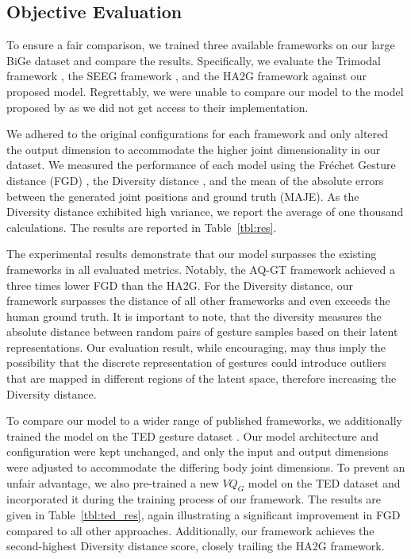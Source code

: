 \documentclass[sigconf]{acmart}
\begin{document}
\subsection{Objective Evaluation}
To ensure a fair comparison, we trained three available frameworks on our large BiGe dataset and compare the results. Specifically, we evaluate the Trimodal framework \cite{yoonSpeechGestureGeneration2020}, the SEEG framework \cite{liangSEEGSemanticEnergized2022}, and the HA2G framework \cite{liuLearningHierarchicalCrossModal2022a} against our proposed model. Regrettably, we were unable to compare our model to the model proposed by \citet{aoRhythmicGesticulatorRhythmAware2022a} as we did not get access to their implementation.

We adhered to the original configurations for each framework and only altered the output dimension to accommodate the higher joint dimensionality in our dataset. We measured the performance of each model using the Fréchet Gesture distance (FGD) \cite{yoonSpeechGestureGeneration2020}, the Diversity distance \cite{liuLearningHierarchicalCrossModal2022a}, and the mean of the absolute errors between the generated joint positions and ground truth (MAJE). As the Diversity distance exhibited high variance, we report the average of one thousand calculations. The results are reported in Table~\ref{tbl:res}.

The experimental results demonstrate that our model surpasses the existing frameworks in all evaluated metrics. Notably, the AQ-GT framework achieved a three times lower FGD than the HA2G. For the Diversity distance, our framework surpasses the distance of all other frameworks and even exceeds the human ground truth. It is important to note, that the diversity measures the absolute distance between random pairs of gesture samples based on their latent representations. Our evaluation result, while encouraging, may thus imply the possibility that the discrete representation of gestures could introduce outliers that are mapped in different regions of the latent space, therefore increasing the Diversity distance. 

To compare our model to a wider range of published frameworks, we additionally trained the model on the TED gesture dataset \cite{yoonRobotsLearnSocial2019a}. Our model architecture and configuration were kept unchanged, and only the input and output dimensions were adjusted to accommodate the differing body joint dimensions. To prevent an unfair advantage, we also pre-trained a new $VQ_G$ model on the TED dataset and incorporated it during the training process of our framework. The results are given in Table~\ref{tbl:ted_res}, again illustrating a significant improvement in FGD compared to all other approaches. Additionally, our framework achieves the second-highest Diversity distance score, closely trailing the HA2G framework. 
\end{document}

